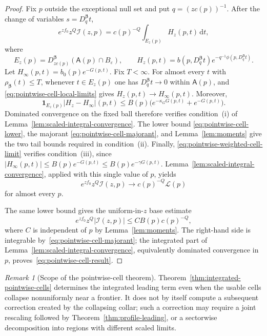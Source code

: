 \documentclass[11pt]{amsart}
\numberwithin{equation}{section}
\theoremstyle{definition}
\theoremstyle{remark}
\newtheorem{remark}[theorem]{Remark}
\newcommand{\ind}{\mathbf{1}}
\newcommand{\dd}{\,\mathrm{d}}
\newcommand{\eps}{\varepsilon}
\newcommand{\cI}{\mathcal{I}}
\newcommand{\Afib}{\mathsf{A}}
\newcommand{\cL}{\mathcal{L}}
\begin{document}
\begin{proof}
Fix $p$ outside the exceptional null set and put $q=(zc(p))^{-1}$.  After the
change of variables $s=D_q^{\bm\beta}t$,
\begin{equation}\label{eq:pointwise-cell-scaled}
 e^{zf_0}z^Q\cI(z,p)
 =c(p)^{-Q}\int_{E_z(p)}H_z(p,t)\dd t,
\end{equation}
where
\[
 E_z(p)=D_{zc(p)}^{\bm\beta}(\Afib(p)\cap B_\eps),\qquad
 H_z(p,t)=b(p,D_q^{\bm\beta}t)
 e^{-q^{-1}\phi(p,D_q^{\bm\beta}t)}.
\]
Let $H_\infty(p,t)=b_0(p)e^{-G(p,t)}$.  Fix $T<\infty$.  For almost every
$t$ with $\rho_{\bm\beta}(t)\le T$, whenever $t\in E_z(p)$ one has
$D_q^{\bm\beta}t\to0$ within $\Afib(p)$, and
\eqref{eq:pointwise-cell-local-limits} gives
$H_z(p,t)\to H_\infty(p,t)$.  Moreover,
\[
 \ind_{E_z(p)}|H_z-H_\infty|(p,t)
 \le B(p)\bigl(e^{-\kappa_G G(p,t)}+e^{-G(p,t)}\bigr).
\]
Dominated convergence on the fixed ball therefore verifies condition~(i) of
Lemma~\ref{lem:scaled-integral-convergence}.  The lower bound
\eqref{eq:pointwise-cell-lower}, the majorant
\eqref{eq:pointwise-cell-majorant}, and Lemma~\ref{lem:moments} give the two
tail bounds required in condition~(ii).  Finally,
\eqref{eq:pointwise-weighted-cell-limit} verifies condition~(iii), since
$|H_\infty(p,t)|\le B(p)e^{-G(p,t)}\le B(p)e^{-\gamma G(p,t)}$.
Lemma~\ref{lem:scaled-integral-convergence}, applied with this single value of
$p$, yields
\[
 e^{zf_0}z^Q\cI(z,p)\longrightarrow c(p)^{-Q}\cL(p)
\]
for almost every $p$.

The same lower bound gives the uniform-in-$z$ base estimate
\[
 e^{zf_0}z^Q|\cI(z,p)|
 \le C B(p)c(p)^{-Q},
\]
where $C$ is independent of $p$ by Lemma~\ref{lem:moments}.  The right-hand
side is integrable by~\eqref{eq:pointwise-cell-majorant}; the integrated part
of Lemma~\ref{lem:scaled-integral-convergence}, equivalently dominated
convergence in $p$, proves~\eqref{eq:pointwise-cell-result}.
\end{proof}

\begin{remark}[Scope of the pointwise-cell theorem]
Theorem~\ref{thm:integrated-pointwise-cells} determines the integrated leading
term even when the usable cells collapse nonuniformly near a frontier.  It does
not by itself compute a subsequent correction created by the collapsing
collar; such a correction may require a joint rescaling followed by
Theorem~\ref{thm:profile-leading}, or a sectorwise decomposition into regions
with different scaled limits.
\end{remark}
\end{document}
